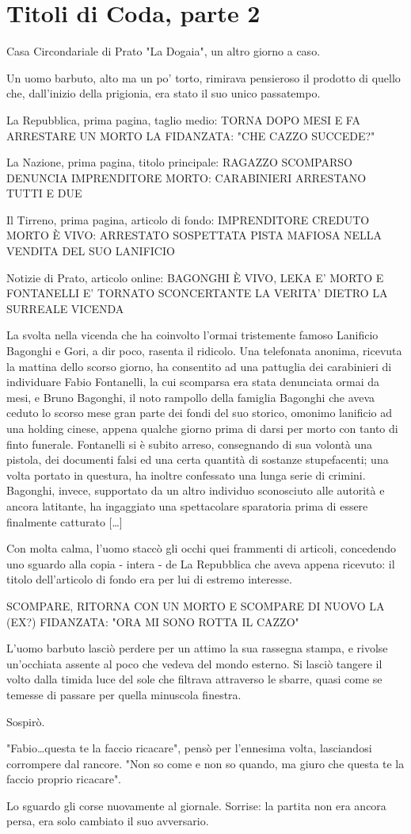 \chapter{Titoli di Coda, parte 2}

Casa Circondariale di Prato "La Dogaia", un altro giorno a caso.

Un uomo barbuto, alto ma un po' torto, rimirava pensieroso il prodotto di quello che, dall'inizio della prigionia, era stato il suo unico passatempo.

La Repubblica, prima pagina, taglio medio:
TORNA DOPO MESI E FA ARRESTARE UN MORTO
LA FIDANZATA: "CHE CAZZO SUCCEDE?"

La Nazione, prima pagina, titolo principale:
RAGAZZO SCOMPARSO DENUNCIA IMPRENDITORE MORTO: 
CARABINIERI ARRESTANO TUTTI E DUE

Il Tirreno, prima pagina, articolo di fondo:
IMPRENDITORE CREDUTO MORTO È VIVO: ARRESTATO
SOSPETTATA PISTA MAFIOSA NELLA VENDITA DEL SUO LANIFICIO

Notizie di Prato, articolo online:
BAGONGHI È VIVO, LEKA E' MORTO E FONTANELLI E' TORNATO
SCONCERTANTE LA VERITA' DIETRO LA SURREALE VICENDA

La svolta nella vicenda che ha coinvolto l'ormai tristemente famoso Lanificio Bagonghi e Gori, a dir poco, rasenta il ridicolo. Una telefonata anonima, ricevuta la mattina dello scorso giorno, ha consentito ad una pattuglia dei carabinieri di individuare Fabio Fontanelli, la cui scomparsa era stata denunciata ormai da mesi, e Bruno Bagonghi, il noto rampollo della famiglia Bagonghi che aveva ceduto lo scorso mese gran parte dei fondi del suo storico, omonimo lanificio ad una holding cinese, appena qualche giorno prima di darsi per morto con tanto di finto funerale. Fontanelli si è subito arreso, consegnando di sua volontà una pistola, dei documenti falsi ed una certa quantità di sostanze stupefacenti; una volta portato in questura, ha inoltre confessato una lunga serie di crimini. Bagonghi, invece, supportato da un altro individuo sconosciuto alle autorità e ancora latitante, ha ingaggiato una spettacolare sparatoria prima di essere finalmente catturato [\ldots]

Con molta calma, l'uomo staccò gli occhi quei frammenti di articoli, concedendo uno sguardo alla copia - intera - de La Repubblica che aveva appena ricevuto: il titolo dell'articolo di fondo era per lui di estremo interesse.

SCOMPARE, RITORNA CON UN MORTO E SCOMPARE DI NUOVO
LA (EX?) FIDANZATA: "ORA MI SONO ROTTA IL CAZZO"

L'uomo barbuto lasciò perdere per un attimo la sua rassegna stampa, e rivolse un'occhiata assente al poco che vedeva del mondo esterno. Si lasciò tangere il volto dalla timida luce del sole che filtrava attraverso le sbarre, quasi come se temesse di passare per quella minuscola finestra. 

Sospirò.

"Fabio\ldots questa te la faccio ricacare", pensò per l'ennesima volta, lasciandosi corrompere dal rancore. "Non so come e non so quando, ma giuro che questa te la faccio proprio ricacare".

Lo sguardo gli corse nuovamente al giornale. Sorrise: la partita non era ancora persa, era solo cambiato il suo avversario.
